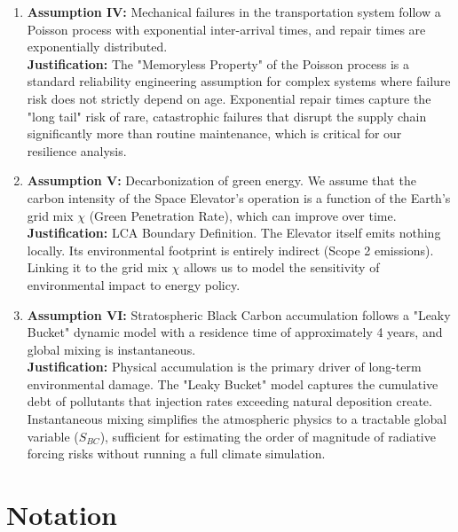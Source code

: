 \documentclass[11pt,letterpaper]{article}
\begin{document}
\begin{enumerate}[leftmargin=2.5em]
  \item \textbf{\large Assumption IV:} Mechanical failures in the transportation system follow a Poisson process with exponential inter-arrival times, and repair times are exponentially distributed. \\
  \textbf{\large Justification:} The "Memoryless Property" of the Poisson process is a standard reliability engineering assumption for complex systems where failure risk does not strictly depend on age. Exponential repair times capture the "long tail" risk of rare, catastrophic failures that disrupt the supply chain significantly more than routine maintenance, which is critical for our resilience analysis.

  \item \textbf{\large Assumption V:} Decarbonization of green energy. We assume that the carbon intensity of the Space Elevator's operation is a function of the Earth's grid mix $\chi$ (Green Penetration Rate), which can improve over time. \\
  \textbf{\large Justification:} LCA Boundary Definition. The Elevator itself emits nothing locally. Its environmental footprint is entirely indirect (Scope 2 emissions). Linking it to the grid mix $\chi$ allows us to model the sensitivity of environmental impact to energy policy.

  \item \textbf{\large Assumption VI:} Stratospheric Black Carbon accumulation follows a "Leaky Bucket" dynamic model with a residence time of approximately 4 years, and global mixing is instantaneous. \\
  \textbf{\large Justification:} Physical accumulation is the primary driver of long-term environmental damage. The "Leaky Bucket" model captures the cumulative debt of pollutants that injection rates exceeding natural deposition create. Instantaneous mixing simplifies the atmospheric physics to a tractable global variable ($S_{BC}$), sufficient for estimating the order of magnitude of radiative forcing risks without running a full climate simulation.
\end{enumerate}
\newpage
\section{Notation}
\end{document}
